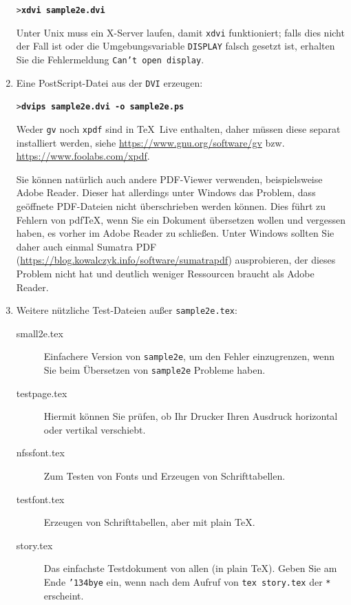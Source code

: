 \documentclass[12pt,ngerman,a4paper,fullparskip]{scrreprt}
\newcommand{\TL}{\TeX\ Live\xspace}
\newcommand{\acro}[1]{\texttt{#1}}
\newcommand{\cmdname}[1]{\texttt{#1}}
\newcommand{\code}[1]{\texttt{#1}}
\newcommand{\filename}[1]{\texttt{#1}}
\newcommand{\envname}[1]{\texttt{#1}}
\newcommand{\samp}[1]{\texttt{#1}}
\newcommand{\Ucom}[1]{\textbf{\texttt{#1}}}
\newcommand{\bs}{\protect\normalfont\ttfamily\char'134}
\providecommand*{\PS}{Post\-Script\xspace}
\providecommand*{\dvi}{\acro{DVI}\xspace}
\begin{document}
\begin{enumerate}
\begin{alltt}
> \Ucom{xdvi sample2e.dvi}    
\end{alltt}

Unter Unix muss ein X-Server laufen, damit \cmdname{xdvi} funktioniert; falls dies nicht der Fall ist oder die Umgebungsvariable \envname{DISPLAY} falsch gesetzt ist, erhalten Sie die Fehlermeldung \samp{Can't open display}.

\item Eine \PS{}-Datei aus der \dvi erzeugen:
\begin{alltt}
> \Ucom{dvips sample2e.dvi -o sample2e.ps}
\end{alltt}

Weder \cmdname{gv} noch \cmdname{xpdf} sind in \TL{} enthalten, daher müssen diese separat installiert
werden, siehe \url{https://www.gnu.org/software/gv} bzw. \url{https://www.foolabs.com/xpdf}.

Sie können natürlich auch andere PDF-Viewer verwenden, beispielsweise Adobe Reader. Dieser hat allerdings unter Windows das Problem, dass geöffnete PDF-Dateien nicht überschrieben werden können. Dies führt zu Fehlern von pdf\TeX, wenn Sie ein Dokument übersetzen wollen und vergessen haben, es vorher im Adobe Reader zu schließen. Unter Windows sollten Sie daher auch einmal Sumatra PDF (\url{https://blog.kowalczyk.info/software/sumatrapdf}) ausprobieren, der dieses Problem nicht hat und deutlich weniger Ressourcen braucht als Adobe Reader.

\item Weitere nützliche Test-Dateien außer
\filename{sample2e.tex}:

\begin{description}
\item [small2e.tex] Einfachere Version von \filename{sample2e}, um den Fehler einzugrenzen, wenn Sie
beim Übersetzen von \filename{sample2e} Probleme haben.
\item [testpage.tex] Hiermit können Sie prüfen, ob Ihr Drucker Ihren Ausdruck horizontal oder vertikal verschiebt.
\item [nfssfont.tex] Zum Testen von Fonts und Erzeugen von Schrifttabellen.
\item [testfont.tex] Erzeugen von Schrifttabellen, aber mit plain \TeX.
\item [story.tex] Das einfachste Testdokument von allen (in plain \TeX{}).
Geben Sie am Ende \samp{\bs bye} ein, wenn nach dem Aufruf von \samp{tex
story.tex} der \code{*} erscheint.
\end{description}


\end{enumerate}
\end{document}
